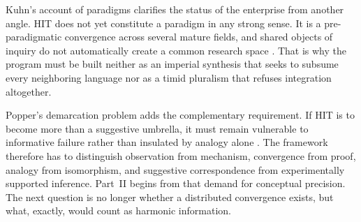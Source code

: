 Kuhn's account of paradigms clarifies the status of the enterprise from another angle. HIT does not yet constitute a paradigm in any strong sense. It is a pre-paradigmatic convergence across several mature fields, and shared objects of inquiry do not automatically create a common research space \parencite{kuhn_1962}. That is why the program must be built neither as an imperial synthesis that seeks to subsume every neighboring language nor as a timid pluralism that refuses integration altogether.

Popper's demarcation problem adds the complementary requirement. If HIT is to become more than a suggestive umbrella, it must remain vulnerable to informative failure rather than insulated by analogy alone \parencite{popper_1959}. The framework therefore has to distinguish observation from mechanism, convergence from proof, analogy from isomorphism, and suggestive correspondence from experimentally supported inference. Part~II begins from that demand for conceptual precision. The next question is no longer whether a distributed convergence exists, but what, exactly, would count as harmonic information.
